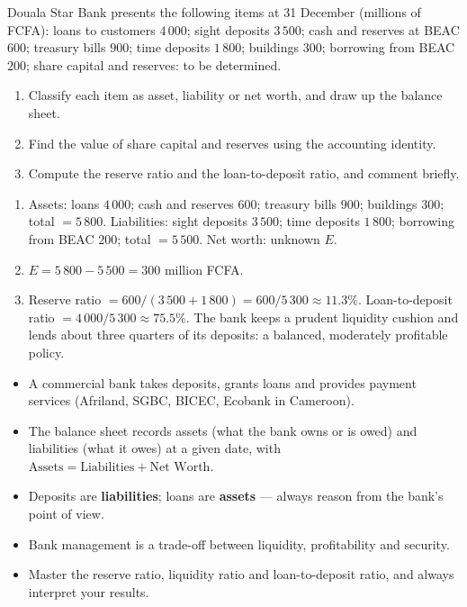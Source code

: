 \documentclass[11pt]{article}
\newcommand{\cle}[1]{{\popxbold\color{popdark}#1}}
\begin{document}
\begin{exercice}
Douala Star Bank presents the following items at 31 December (millions of FCFA): loans to customers $4\,000$; sight deposits $3\,500$; cash and reserves at BEAC $600$; treasury bills $900$; time deposits $1\,800$; buildings $300$; borrowing from BEAC $200$; share capital and reserves: to be determined.
\begin{enumerate}
\item Classify each item as asset, liability or net worth, and draw up the balance sheet.
\item Find the value of share capital and reserves using the accounting identity.
\item Compute the reserve ratio and the loan-to-deposit ratio, and comment briefly.
\end{enumerate}
\end{exercice}

\begin{corrige}[Exercise 1]
\begin{enumerate}
\item Assets: loans $4\,000$; cash and reserves $600$; treasury bills $900$; buildings $300$; total $= 5\,800$. Liabilities: sight deposits $3\,500$; time deposits $1\,800$; borrowing from BEAC $200$; total $= 5\,500$. Net worth: unknown $E$.
\item $E = 5\,800 - 5\,500 = 300$ million FCFA.
\item Reserve ratio $= 600 / (3\,500 + 1\,800) = 600 / 5\,300 \approx 11.3\%$. Loan-to-deposit ratio $= 4\,000 / 5\,300 \approx 75.5\%$. The bank keeps a prudent liquidity cushion and lends about three quarters of its deposits: a balanced, moderately profitable policy.
\end{enumerate}
\end{corrige}

\begin{aretenir}
\begin{itemize}
\item A commercial bank takes deposits, grants loans and provides payment services (Afriland, SGBC, BICEC, Ecobank in Cameroon).
\item The \cle{balance sheet} records assets (what the bank owns or is owed) and liabilities (what it owes) at a given date, with $\text{Assets} = \text{Liabilities} + \text{Net Worth}$.
\item Deposits are \textbf{liabilities}; loans are \textbf{assets} — always reason from the bank's point of view.
\item Bank management is a trade-off between \cle{liquidity}, \cle{profitability} and \cle{security}.
\item Master the reserve ratio, liquidity ratio and loan-to-deposit ratio, and always interpret your results.
\end{itemize}
\end{aretenir}
\end{document}
